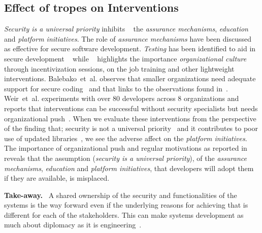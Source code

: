 \documentclass[conference]{IEEEtran}
\newenvironment{finding}{\begin{framed}\noindent\textbf{Take-away.}~}{\end{framed}}
\newcommand{\etal}[0]{et~al{.}}
\begin{document}
\subsection{Effect of tropes on Interventions}  
\emph{Security is a universal priority} inhibits ~\cite{witschey2015,weir2020,McGraw2018} the \emph{assurance mechanisms},  \emph{education} and \emph{platform initiatives}. The role of \emph{assurance mechanisms} have been discussed as effective for secure software development. \emph{Testing} has been identified to aid in secure development ~\cite{jose2016} while ~\cite{weir2020,haney2018,thomas2018} highlights the importance \emph{organizational culture} through incentivization sessions, on the job training and other lightweight interventions. Balebako~\etal{} observes that smaller organizations need adequate support for secure coding~\cite{balebako2014} and that links to the observations found in~\cite{weir2021}. Weir~\etal{} experiments with over 80 developers across 8 organizations and reports that interventions can be successful without security specialists but needs organizational push~\cite{weir2021,tondel2008}. When we evaluate these interventions from the perspective of the finding that; security is not a universal priority~\cite{acar2016,tahaei2019} and it contributes to poor use of updated libraries~\cite{vaniea2016}, we see the adverse affect on the \emph{platform initiatives}. The importance of organizational push and regular motivations as reported in~\cite{aside2012,weir2020,weir2021,adoption2014} reveals that the assumption (\emph{security is a universal priority}), of the \emph{assurance mechanisms}, \emph{education} and \emph{platform initiatives}, that developers will adopt them if they are available, is misplaced.
\begin{finding}
\noindent  
A shared ownership of the security and functionalities of the systems is the way forward even if the underlying reasons for achieving that is different for each of the stakeholders. This can make systems development as much about diplomacy as it is engineering~\cite{bruce2013}.   
\end{finding}
\end{document}
